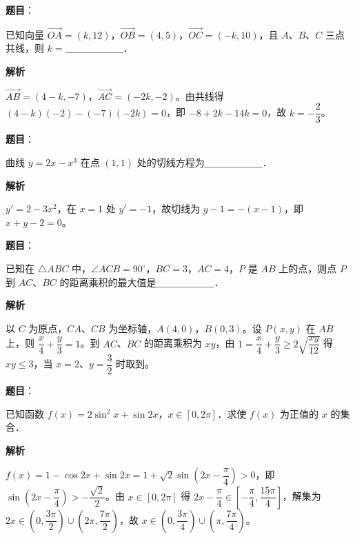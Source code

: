 \begin{answer}

\textbf{题目}：

已知向量 $\overrightarrow{OA} = (k, 12)$，$\overrightarrow{OB} = (4, 5)$，$\overrightarrow{OC} = (-k, 10)$，且 $A$、$B$、$C$ 三点共线，则 $k =$＿＿＿＿＿＿．

\textbf{解析}

$\overrightarrow{AB} = (4 - k, -7)$，$\overrightarrow{AC} = (-2k, -2)$。由共线得 $(4-k)(-2) - (-7)(-2k) = 0$，即 $-8 + 2k - 14k = 0$，故 $k = -\dfrac{2}{3}$。


\end{answer}
\begin{answer}

\textbf{题目}：

曲线 $y = 2x - x^3$ 在点 $(1, 1)$ 处的切线方程为＿＿＿＿＿＿．

\textbf{解析}

$y' = 2 - 3x^2$，在 $x = 1$ 处 $y' = -1$，故切线为 $y - 1 = -(x - 1)$，即 $x + y - 2 = 0$。


\end{answer}
\begin{answer}

\textbf{题目}：

已知在 $\triangle ABC$ 中，$\angle ACB = 90^\circ$，$BC = 3$，$AC = 4$，$P$ 是 $AB$ 上的点，则点 $P$ 到 $AC$、$BC$ 的距离乘积的最大值是＿＿＿＿＿＿．

\textbf{解析}

以 $C$ 为原点，$CA$、$CB$ 为坐标轴，$A(4, 0)$，$B(0, 3)$。设 $P(x, y)$ 在 $AB$ 上，则 $\dfrac{x}{4} + \dfrac{y}{3} = 1$。到 $AC$、$BC$ 的距离乘积为 $xy$，由 $1 = \dfrac{x}{4} + \dfrac{y}{3} \geqslant 2\sqrt{\dfrac{xy}{12}}$ 得 $xy \leqslant 3$，当 $x = 2$、$y = \dfrac{3}{2}$ 时取到。


\end{answer}
\begin{answer}

\textbf{题目}：

已知函数 $f(x) = 2\sin^2 x + \sin 2x$，$x \in [0, 2\pi]$．求使 $f(x)$ 为正值的 $x$ 的集合．

\textbf{解析}

$f(x) = 1 - \cos 2x + \sin 2x = 1 + \sqrt{2}\sin\left(2x - \dfrac{\pi}{4}\right) > 0$，即 $\sin\left(2x - \dfrac{\pi}{4}\right) > -\dfrac{\sqrt{2}}{2}$。由 $x \in [0, 2\pi]$ 得 $2x - \dfrac{\pi}{4} \in \left[-\dfrac{\pi}{4}, \dfrac{15\pi}{4}\right]$，解集为 $2x \in \left(0, \dfrac{3\pi}{2}\right) \cup \left(2\pi, \dfrac{7\pi}{2}\right)$，故 $x \in \left(0, \dfrac{3\pi}{4}\right) \cup \left(\pi, \dfrac{7\pi}{4}\right)$。


\end{answer}

